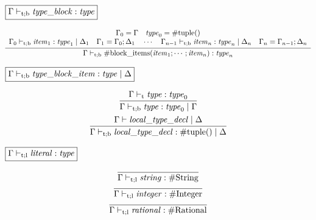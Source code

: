 $\fbox{$\Gamma \vdash_{\mathrm{t}; \mathrm{b}} \mathit{type\_block}: \mathit{type}$}$

\begin{gather*}
    \infer{\Gamma \vdash_{\mathrm{t}; \mathrm{b}} \mathrm{\#block\_items}(\mathit{item}_1; \cdots; \mathit{item}_n): \mathit{type}_n}{
        \begin{array}{c}
            \Gamma_0 = \Gamma
            \hspace{1em}
            \mathit{type}_0 = \mathrm{\#tuple}()
            \\
            \Gamma_0 \vdash_{\mathrm{t}; \mathrm{b}} \mathit{item}_1: \mathit{type}_1 \mid \Delta_1
            \hspace{1em}
            \Gamma_1 = \Gamma_0; \Delta_1
            \hspace{1em}
            \cdots
            \hspace{1em}
            \Gamma_{n - 1} \vdash_{\mathrm{t}; \mathrm{b}} \mathit{item}_n: \mathit{type}_n \mid \Delta_n
            \hspace{1em}
            \Gamma_n = \Gamma_{n - 1}; \Delta_n
        \end{array}
    }
\end{gather*}

$\fbox{$\Gamma \vdash_{\mathrm{t}; \mathrm{b}} \mathit{type\_block\_item}: \mathit{type} \mid \Delta$}$

\begin{gather*}
    \infer{\Gamma \vdash_{\mathrm{t}; \mathrm{b}} \mathit{type}: \mathit{type}_0 \mid \Gamma}{
        \Gamma \vdash_\mathrm{t} \mathit{type}: \mathit{type}_0
    }
    \\
    \infer{\Gamma \vdash_{\mathrm{t}; \mathrm{b}} \mathit{local\_type\_decl}: \mathrm{\#tuple}() \mid \Delta}{
        \Gamma \vdash \mathit{local\_type\_decl} \mid \Delta
    }
\end{gather*}

$\fbox{$\Gamma \vdash_{\mathrm{t}; \mathrm{l}} \mathit{literal}: \mathit{type}$}$

\begin{gather*}
    \infer{\Gamma \vdash_{\mathrm{t}; \mathrm{l}} \mathit{string}: \mathrm{\#String}}{}
    \\
    \infer{\Gamma \vdash_{\mathrm{t}; \mathrm{l}} \mathit{integer}: \mathrm{\#Integer}}{}
    \\
    \infer{\Gamma \vdash_{\mathrm{t}; \mathrm{l}} \mathit{rational}: \mathrm{\#Rational}}{}
\end{gather*}

